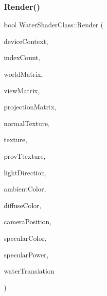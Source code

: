 \subsubsection{\texorpdfstring{Render()}{Render()}}
{\footnotesize\ttfamily bool Water\+Shader\+Class\+::\+Render (\begin{DoxyParamCaption}\item[{I\+D3\+D11\+Device\+Context $\ast$}]{device\+Context,  }\item[{int}]{index\+Count,  }\item[{D3\+D\+X\+M\+A\+T\+R\+IX}]{world\+Matrix,  }\item[{D3\+D\+X\+M\+A\+T\+R\+IX}]{view\+Matrix,  }\item[{D3\+D\+X\+M\+A\+T\+R\+IX}]{projection\+Matrix,  }\item[{I\+D3\+D11\+Shader\+Resource\+View $\ast$}]{normal\+Texture,  }\item[{I\+D3\+D11\+Shader\+Resource\+View $\ast$}]{texture,  }\item[{I\+D3\+D11\+Shader\+Resource\+View $\ast$}]{prov\+Ttexture,  }\item[{D3\+D\+X\+V\+E\+C\+T\+O\+R3}]{light\+Direction,  }\item[{D3\+D\+X\+V\+E\+C\+T\+O\+R4}]{ambient\+Color,  }\item[{D3\+D\+X\+V\+E\+C\+T\+O\+R4}]{diffuse\+Color,  }\item[{D3\+D\+X\+V\+E\+C\+T\+O\+R3}]{camera\+Position,  }\item[{D3\+D\+X\+V\+E\+C\+T\+O\+R4}]{specular\+Color,  }\item[{float}]{specular\+Power,  }\item[{float}]{water\+Translation }\end{DoxyParamCaption})}


